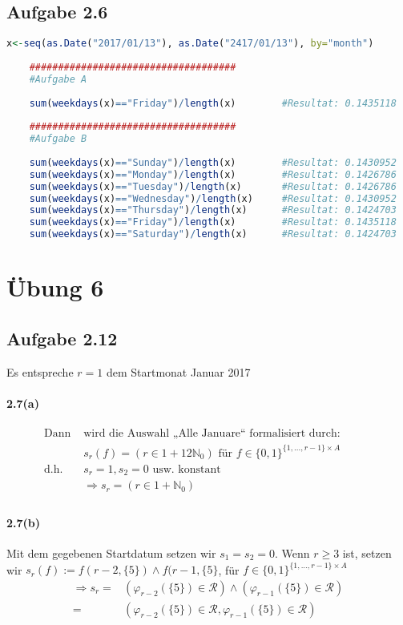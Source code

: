 \documentclass[10pt, a4paper]{article}
\begin{document}
\subsection{Aufgabe 2.6}
\begin{lstlisting}[language=R]
	x<-seq(as.Date("2017/01/13"), as.Date("2417/01/13"), by="month")
	
	####################################
	#Aufgabe A
	
	sum(weekdays(x)=="Friday")/length(x)		#Resultat: 0.1435118
	
	####################################
	#Aufgabe B
	
	sum(weekdays(x)=="Sunday")/length(x)		#Resultat: 0.1430952
	sum(weekdays(x)=="Monday")/length(x)		#Resultat: 0.1426786
	sum(weekdays(x)=="Tuesday")/length(x)		#Resultat: 0.1426786
	sum(weekdays(x)=="Wednesday")/length(x)		#Resultat: 0.1430952
	sum(weekdays(x)=="Thursday")/length(x)		#Resultat: 0.1424703
	sum(weekdays(x)=="Friday")/length(x)		#Resultat: 0.1435118
	sum(weekdays(x)=="Saturday")/length(x)		#Resultat: 0.1424703
\end{lstlisting}


\section{Übung 6}
\subsection{Aufgabe 2.12}
Es entspreche $r=1$ dem Startmonat Januar 2017
\paragraph*{2.7(a)}
\begin{align*}
	\text{Dann }& \text{wird die Auswahl „Alle Januare“ formalisiert durch:}~~~~~~~~~~~~~	\\
	&s_{r}(f)=(r\in1+12\mathbb{N}_{0}) \text{ für } f\in\{0,1\}^{\{1,...,r-1\}\times A}	\\
	\text{d.h. }\hspace{5pt}& s_{r}=1, s_{2}=0 \text{ usw. konstant}	\\
	& \Rightarrow s_{r}=(r\in1+\mathbb{N}_{0})	\\
\end{align*}


\paragraph*{2.7(b)}
Mit dem gegebenen Startdatum setzen wir $s_{1}=s_{2}=0$. Wenn $r\geq3$ ist, setzen wir $s_{r}(f):=f(r-2,\{5\})\wedge f(r-1,\{5\}$, für $f\in\{0,1\}^{\{1,...,r-1\}\times A}$
\begin{align*}
	\Rightarrow s_{r}=&(\varphi_{r-2}(\{5\})\in\mathcal{R})\wedge(\varphi_{r-1}(\{5\})\in\mathcal{R})	\\
	=&(\varphi_{r-2}(\{5\})\in\mathcal{R}, \varphi_{r-1}(\{5\})\in\mathcal{R})	\\
\end{align*}
\end{document}
